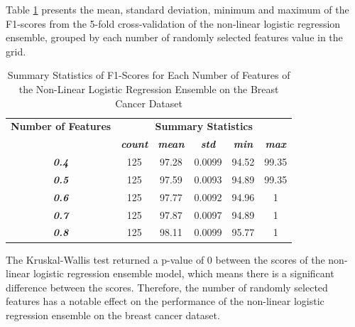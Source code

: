 \documentclass[10pt, conference]{IEEEtran}
\begin{document}
Table \ref{table: BC_feature_nonlinear_performance_metrics} presents the mean, standard deviation, minimum and maximum of the
F1-scores from the 5-fold cross-validation of the non-linear logistic regression ensemble, grouped by each number of randomly selected
features value in the grid.
\begin{table}[H]
    \caption{Summary Statistics of F1-Scores for Each Number of Features of the Non-Linear Logistic Regression Ensemble on the Breast Cancer Dataset}
    \begin{center}
        \begin{tabular}{|c||c|c|c|c|c|}
            \hline
            \textbf{Number of Features}&\multicolumn{5}{|c|}{\textbf{Summary Statistics}} \\
            \cline{2-6}
                                &\textbf{\textit{count}} & \textbf{\textit{mean}} & \textbf{\textit{std}} & \textbf{\textit{min}} & \textbf{\textit{max}}\\
            \hline
            \textbf{\textit{0.4}} & 125 & 97.28 & 0.0099 & 94.52 & 99.35 \\
            \textbf{\textit{0.5}} & 125 & 97.59 & 0.0093 & 94.89 & 99.35 \\
            \textbf{\textit{0.6}} & 125 & 97.77 & 0.0092 & 94.96 & 1 \\
            \textbf{\textit{0.7}} & 125 & 97.87 & 0.0097 & 94.89 & 1 \\
            \textbf{\textit{0.8}} & 125 & 98.11 & 0.0099 & 95.77 & 1 \\
            \hline
        \end{tabular}
    \end{center}
    \label{table: BC_feature_nonlinear_performance_metrics}
\end{table}
The Kruskal-Wallis test returned a p-value of 0 between the scores of the non-linear logistic regression ensemble model,
which means there is a significant difference between the scores. Therefore, the number of randomly selected
features has a notable effect on the performance of the non-linear logistic regression ensemble on the breast cancer dataset.
\end{document}
